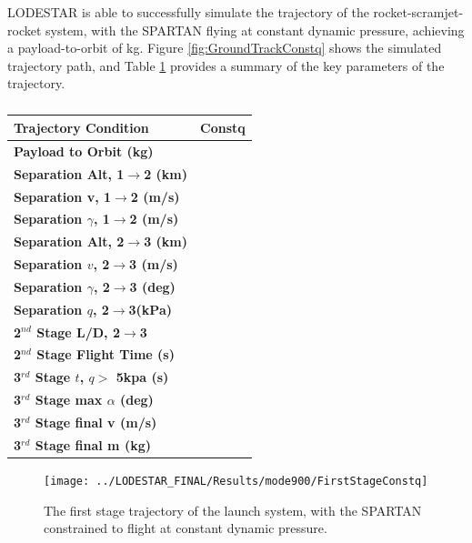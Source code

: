 LODESTAR is able to successfully simulate the trajectory of the rocket-scramjet-rocket system, with the SPARTAN flying at constant dynamic pressure, achieving a payload-to-orbit of \PayloadToOrbitConstq kg.
Figure \ref{fig:GroundTrackConstq} shows the simulated trajectory path, and Table \ref{tab:constqsummary} provides a summary of the key parameters of the trajectory.
\begin{table}[ht]
	\centering
	

\begin{tabular}{l c } 
	\hline \textbf{Trajectory Condition}
	& Constq
	\\
	\hline \textbf{Payload to Orbit (kg)}
	& \PayloadToOrbitConstq
	\\
	\textbf{Separation Alt, 1$\rightarrow$2 (km)}
	& \firstsecondSeparationAltConstq
	\\
	\textbf{Separation v, 1$\rightarrow$2 (m/s)}
	& \firstsecondSeparationvConstq
	\\
	\textbf{Separation $\gamma$, 1$\rightarrow$2 (m/s)}
	& \firstsecondSeparationgammaConstq
	\\
	\textbf{Separation Alt, 2$\rightarrow$3 (km)}
	& \secondthirdSeparationAltConstq
	\\
	\textbf{Separation $v$, 2$\rightarrow$3 (m/s)}
	& \secondthirdSeparationvConstq
	\\
	\textbf{Separation $\gamma$, 2$\rightarrow$3 (deg)}
	& \secondthirdSeparationgammaConstq
	\\
	\textbf{Separation $q$, 2$\rightarrow$3(kPa)}
	& \secondthirdSeparationqConstq
	\\
	\textbf{2$^{nd}$ Stage L/D, 2$\rightarrow$3}
	& \secondthirdSeparationLDConstq
	\\
	\textbf{2$^{nd}$ Stage Flight Time (s)}
	& \secondFlightTimeConstq
	\\
	\textbf{3$^{rd}$ Stage $t$, $q >$ 5kpa (s)}
	& \thirdqOverFiveConstq
	\\
	\textbf{3$^{rd}$ Stage max $\alpha$ (deg)}
	& \thirdmaxAoAConstq
	\\
	\textbf{3$^{rd}$ Stage final v (m/s)}
	& \thirdcircvConstq
	\\
	\textbf{3$^{rd}$ Stage final m (kg)}
	& \thirdcircmConstq
	\\
	\hline 
\end{tabular} 
\caption{}
\label{tab:constqsummary}
\end{table}
\begin{figure}[ht!]
\centering
\texttt{[image: ../LODESTAR\_FINAL/Results/mode900/FirstStageConstq]}
\caption{The first stage trajectory of the launch system, with the SPARTAN constrained to flight at constant dynamic pressure.}
\label{fig:FirstStageConstq}
\end{figure}
